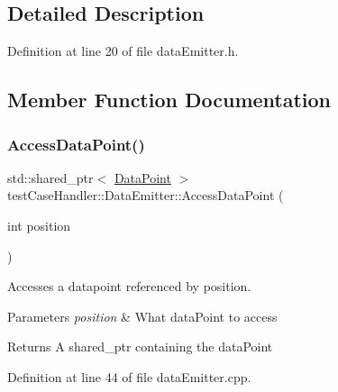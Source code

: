 \subsection{Detailed Description}


Definition at line 20 of file data\+Emitter.\+h.



\subsection{Member Function Documentation}
\mbox{\label{classtestCaseHandler_1_1DataEmitter_ae60b24d8b19793ab7cdac998e8c6c378}} 
\subsubsection{\texorpdfstring{AccessDataPoint()}{AccessDataPoint()}}
{\footnotesize\ttfamily std\+::shared\+\_\+ptr$<$ \mbox{\hyperlink{classtestCaseHandler_1_1DataPoint}{Data\+Point}} $>$ test\+Case\+Handler\+::\+Data\+Emitter\+::\+Access\+Data\+Point (\begin{DoxyParamCaption}\item[{int}]{position }\end{DoxyParamCaption})}



Accesses a datapoint referenced by position. 


\begin{DoxyParams}{Parameters}
{\em position} & What data\+Point to access \\
\hline
\end{DoxyParams}
\begin{DoxyReturn}{Returns}
A shared\+\_\+ptr containing the data\+Point 
\end{DoxyReturn}


Definition at line 44 of file data\+Emitter.\+cpp.

\mbox{\label{classtestCaseHandler_1_1DataEmitter_a608067af5e211ed5bec32d8f319e0842}} 

